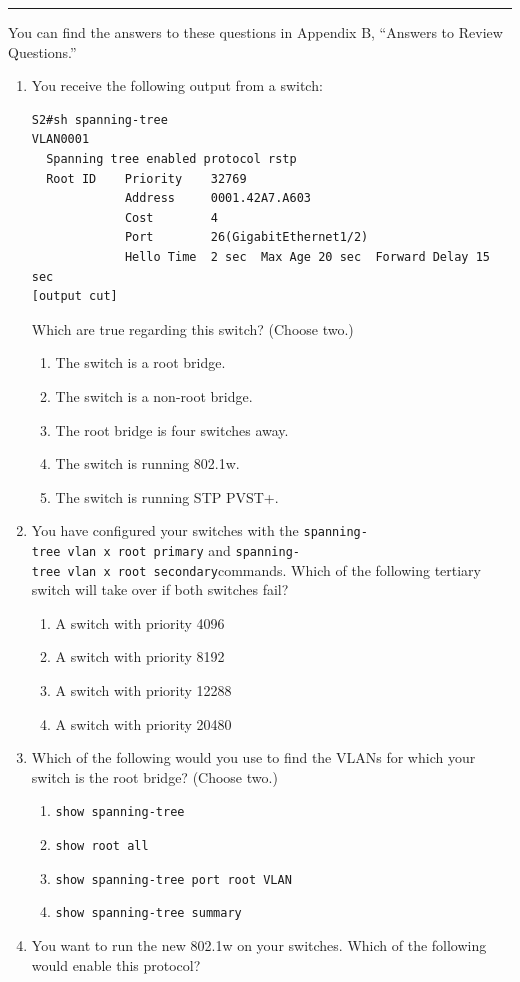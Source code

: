 \begin{center}\rule{0.5\linewidth}{0.5pt}\end{center}

You can find the answers to these questions in Appendix B, ``Answers to
Review Questions.''

\begin{enumerate}
\item
  You receive the following output from a switch:

\begin{verbatim}
S2#sh spanning-tree
VLAN0001
  Spanning tree enabled protocol rstp
  Root ID    Priority    32769
             Address     0001.42A7.A603
             Cost        4
             Port        26(GigabitEthernet1/2)
             Hello Time  2 sec  Max Age 20 sec  Forward Delay 15 sec
[output cut]
\end{verbatim}

  Which are true regarding this switch? (Choose two.)

  \begin{enumerate}
  \tightlist
  \item
    The switch is a root bridge.
  \item
    The switch is a non-root bridge.
  \item
    The root bridge is four switches away.
  \item
    The switch is running 802.1w.
  \item
    The switch is running STP PVST+.
  \end{enumerate}
\item
  You have configured your switches with the
  \texttt{spanning-tree\ vlan\ x\ root\ primary} and
  \texttt{spanning-tree\ vlan\ x\ root\ secondary}commands. Which of the
  following tertiary switch will take over if both switches fail?

  \begin{enumerate}
  \tightlist
  \item
    A switch with priority 4096
  \item
    A switch with priority 8192
  \item
    A switch with priority 12288
  \item
    A switch with priority 20480
  \end{enumerate}
\item
  Which of the following would you use to find the VLANs for which your
  switch is the root bridge? (Choose two.)

  \begin{enumerate}
  \tightlist
  \item
    \texttt{show\ spanning-tree}
  \item
    \texttt{show\ root\ all}
  \item
    \texttt{show\ spanning-tree\ port\ root\ VLAN}
  \item
    \texttt{show\ spanning-tree\ summary}
  \end{enumerate}
\item
  You want to run the
  new 802.1w on your switches. Which of the following would enable this
  protocol?


\end{enumerate}
